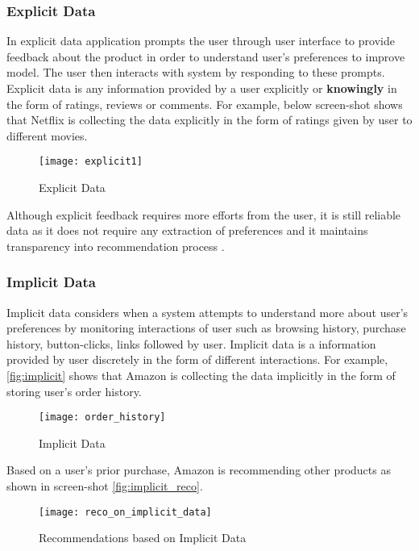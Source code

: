 \subsubsection{Explicit Data}
In explicit data application prompts the user through user interface to provide feedback about the product in order to understand user's preferences to improve model. The user then interacts with system by responding to these prompts. Explicit data is any information provided by a user explicitly or \textbf{knowingly} in the form of ratings, reviews or comments. For example, below screen-shot shows that Netflix is collecting the data explicitly in the form of ratings given by user to different movies. 
\\

\begin{figure}[H]
	\centering
	\texttt{[image: explicit1]}
	\caption{Explicit Data \cite{36}}
	\label{fig:explicit}
\end{figure}

\noindent Although explicit feedback requires more efforts from the user, it is still reliable data as it does not require any extraction of preferences and it maintains transparency into recommendation process \cite{35}. 
 
\subsubsection{Implicit Data}

Implicit data considers when a system attempts to understand more about user's preferences by monitoring interactions of user such as browsing history, purchase history, button-clicks, links followed by user. Implicit data is a information provided by user discretely in the form of different interactions. For example, \autoref{fig:implicit} shows that Amazon is collecting the data implicitly in the form of storing user's order history. 
\begin{figure}[H]
	\centering
	\texttt{[image: order\_history]}
	\caption{Implicit Data}
	\label{fig:implicit}
\end{figure}

\noindent Based on a user's prior purchase, Amazon is recommending other products as shown in screen-shot \autoref{fig:implicit_reco}.

\begin{figure}[H]
	\centering
	\texttt{[image: reco\_on\_implicit\_data]}
	\caption{Recommendations based on Implicit Data}
	\label{fig:implicit_reco}
\end{figure}



